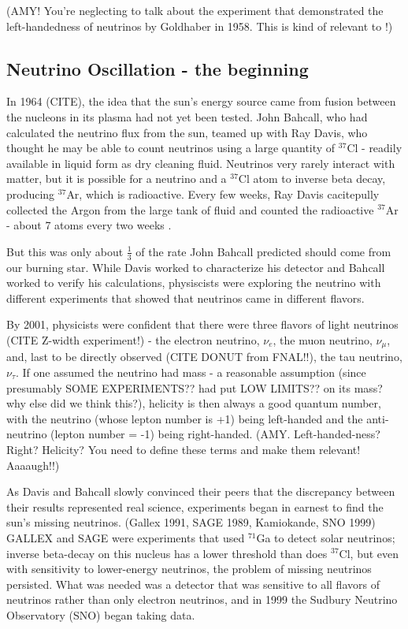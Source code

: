 (AMY!  You're neglecting to talk about the experiment that demonstrated the left-handedness of neutrinos by Goldhaber in 1958.  This is kind of relevant to \zvbb!)

\subsection{Neutrino Oscillation - the beginning}
In 1964 (CITE), the idea that the sun's energy source came from fusion between the nucleons in its plasma had not yet been tested.  John Bahcall, who had calculated the neutrino flux from the sun, teamed up with Ray Davis, who thought he may be able to count neutrinos using a large quantity of $^{37}$Cl - readily available in liquid form as dry cleaning fluid.  Neutrinos very rarely interact with matter, but it is possible for a neutrino and a $^{37}$Cl atom to inverse beta decay, producing $^{37}$Ar, which is radioactive.  Every few weeks, Ray Davis cacitepully collected the Argon from the large tank of fluid and counted the radioactive $^{37}$Ar - about 7 atoms every two weeks \citep{Davis}.

But this was only about $\frac{1}{3}$ of the rate John Bahcall predicted should come from our burning star.  While Davis worked to characterize his detector and Bahcall worked to verify his calculations, physiscists were exploring the neutrino with different experiments that showed that neutrinos came in different flavors.

By 2001, physicists were confident that there were three flavors of light neutrinos (CITE Z-width experiment!) - the electron neutrino, $\nu_e$, the muon neutrino, $\nu_{\mu}$, and, last to be directly observed (CITE DONUT from FNAL!!), the tau neutrino, $\nu_{\tau}$.  If one assumed the neutrino had mass - a reasonable assumption (since presumably SOME EXPERIMENTS?? had put LOW LIMITS?? on its mass?  why else did we think this?), helicity is then always a good quantum number, with the neutrino (whose lepton number is +1) being left-handed and the anti-neutrino (lepton number = -1) being right-handed.  (AMY.  Left-handed-ness?  Right?  Helicity?  You need to define these terms and make them relevant!  Aaaaugh!!)

As Davis and Bahcall slowly convinced their peers that the discrepancy between their results represented real science, experiments began in earnest to find the sun's missing neutrinos.  (Gallex 1991, SAGE 1989, Kamiokande, SNO 1999)  GALLEX and SAGE were experiments that used $^{71}$Ga to detect solar neutrinos; inverse beta-decay on this nucleus has a lower threshold than does $^{37}$Cl, but even with sensitivity to lower-energy neutrinos, the problem of missing neutrinos persisted.  What was needed was a detector that was sensitive to all flavors of neutrinos rather than only electron neutrinos, and in 1999 the Sudbury Neutrino Observatory (SNO) began taking data.

